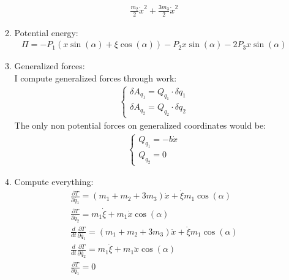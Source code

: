 \begin{enumerate}
\begin{enumerate}
\begin{align}
                        \frac{m_2}{2} \dot{x}^2 +  \frac{3 m_3}{2} \dot{x}^2
                    \end{align}
              \item Potential energy:
                    \begin{align}
                        \Pi = -P_1 (x \sin(\alpha) + \xi \cos(\alpha)) - P_2 x \sin(\alpha) - 2 P_{3} x \sin(\alpha)
                    \end{align}
              \item Generalized forces: \\
                    I compute generalized forces through work:
                    \begin{align}
                        \begin{cases}
                            \delta A_{q_1} = Q_{q_1} \cdot \delta q_1 \\
                            \delta A_{q_2} = Q_{q_2} \cdot \delta q_2
                        \end{cases}
                    \end{align}
                    The only non potential forces on generalized coordinates would be:
                    \begin{align}
                        \begin{cases}
                            Q_{q_1} = -b \dot{x} \\
                            Q_{q_2} = 0
                        \end{cases}
                    \end{align}
              \item Compute everything:
                    \begin{align}
                        \frac{\partial T}{\partial \dot{q_1}} = (m_1 + m_2 + 3 m_3) \dot{x} + \dot{\xi} m_1 \cos(\alpha)                \\
                        \frac{\partial T}{\partial \dot{q_2}} = m_1 \dot{\xi} + m_1 \dot{x} \cos(\alpha)                                \\
                        \frac{d}{dt} \frac{\partial T}{\partial \dot{q_1}} = (m_1 + m_2 + 3 m_3) \ddot{x} + \ddot{\xi} m_1 \cos(\alpha) \\
                        \frac{d}{dt} \frac{\partial T}{\partial \dot{q_2}} = m_1 \ddot{\xi} + m_1 \ddot{x} \cos(\alpha)                 \\
                        \frac{\partial T}{\partial q_1} = 0                                                                             \\

\end{align}
\end{enumerate}
\end{enumerate}
